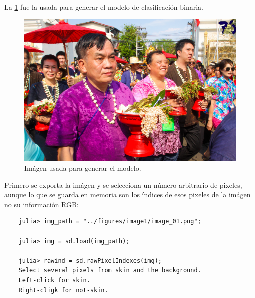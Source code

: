 La \cref{fig:imagen-entrenamiento} fue la usada para generar el modelo de clasificación binaria.
\begin{figure}[ht!]
    \centering
    \includegraphics[scale=0.25]{../figures/image1/image_01.png}
    \caption{Imágen usada para generar el modelo.}
    \label{fig:imagen-entrenamiento}
\end{figure}
Primero se exporta la imágen y se selecciona un número arbitrario de pixeles, aunque lo que se guarda en memoria son los índices de esos pixeles de la imágen no su información RGB:
\begin{verbatim}
    julia> img_path = "../figures/image1/image_01.png";

    julia> img = sd.load(img_path);

    julia> rawind = sd.rawPixelIndexes(img);
    Select several pixels from skin and the background.
    Left-click for skin.
    Right-cligk for not-skin.
\end{verbatim}

